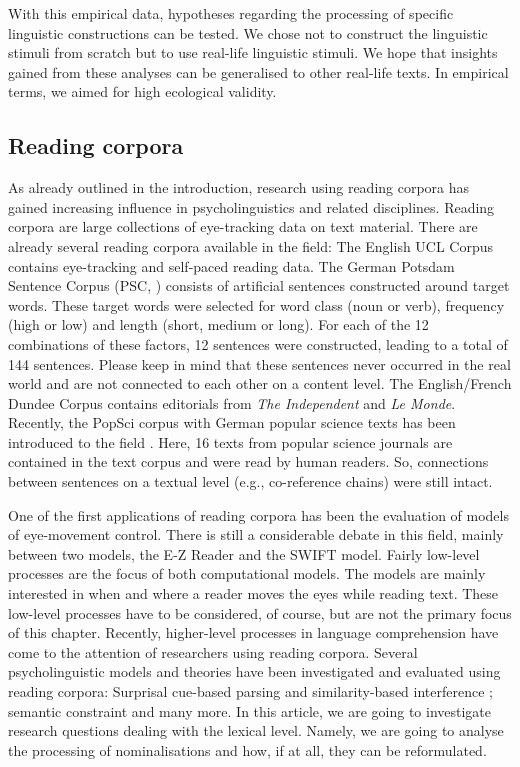 \documentclass[output=paper]{langsci/langscibook}
\begin{document}
With this empirical data, hypotheses regarding the processing of specific linguistic constructions can be tested. We chose not to construct the linguistic stimuli from scratch but to use real-life linguistic stimuli. We hope that insights gained from these analyses can be generalised to other real-life texts. In empirical terms, we aimed for high ecological validity. 

\subsection{\label{bkm:Ref283725832}Reading corpora}

As already outlined in the introduction, research using reading corpora has gained increasing influence in psycholinguistics and related disciplines. Reading corpora are large collections of eye-tracking data on text material. There are already several reading corpora available in the field: The English UCL Corpus \citep{Frank2013} contains eye-tracking and self-paced reading data. The German Potsdam Sentence Corpus (PSC, \citet{Kliegl2006}) consists of artificial sentences constructed around target words. These target words were selected for word class (noun or verb), frequency (high or low) and length (short, medium or long). For each of the 12 combinations of these factors, 12 sentences were constructed, leading to a total of 144 sentences. Please keep in mind that these sentences never occurred in the real world and are not connected to each other on a content level. The English/French Dundee Corpus \citep{Kennedy2003} contains editorials from \textit{The Independent }and \textit{Le Monde}. Recently, the PopSci corpus with German popular science texts has been introduced to the field \citep{MuellerFeldmeth2013}. Here, 16 texts from popular science journals are contained in the text corpus and were read by human readers. So, connections between sentences on a textual level (e.g., co-reference chains) were still intact.

One of the first applications of reading corpora has been the evaluation of models of eye-movement control. There is still a considerable debate in this field, mainly between two models, the E-Z Reader \citep{Reichle2003} and the SWIFT \citep{Engbert2005} model. Fairly low-level processes are the focus of both computational models. The models are mainly interested in when and where a reader moves the eyes while reading text. These low-level processes have to be considered, of course, but are not the primary focus of this chapter. Recently, higher-level processes in language comprehension have come to the attention of researchers using reading corpora. Several psycholinguistic models and theories have been investigated and evaluated using reading corpora: Surprisal \citep{Demberg2008, Patil2009} cue-based parsing and similarity-based interference \citep{MuellerFeldmeth2013}; semantic constraint \citep{Pynte2008} and many more. In this article, we are going to investigate research questions dealing with the lexical level. Namely, we are going to analyse the processing of nominalisations and how, if at all, they can be reformulated.
\end{document}
